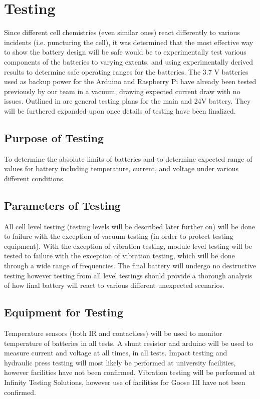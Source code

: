 \documentclass[main.tex]{subfiles}
\begin{document}
    
    
    \section{Testing}
    Since different cell chemistries (even similar ones) react differently to various incidents (i.e. puncturing the cell), it was determined that the most effective way to show the battery design will be safe would be to experimentally test various components of the batteries to varying  extents, and using experimentally derived results to determine safe operating ranges for the batteries. The 3.7 V batteries used as backup power for the Arduino and Raspberry Pi have already been tested previously by our team in a vacuum, drawing expected current draw with no issues. Outlined in  are general testing plans for the main and 24V battery. They will be furthered expanded upon once details of testing have been finalized.
    \subsection{Purpose of Testing}
    To determine the absolute limits of batteries and to determine expected range of values for battery including temperature, current, and voltage under various different conditions.
    \subsection{Parameters of Testing}
    All cell level testing (testing levels will be described later further on) will be done to failure with the exception of vacuum testing (in order to protect testing equipment). With the exception of vibration testing, module level testing will be tested to failure with the exception of vibration testing, which will be done through a wide range of frequencies. The final battery will undergo no destructive testing however testing from all level testings should provide a thorough analysis of how final battery will react to various different unexpected scenarios.
    \subsection{Equipment for Testing}
    Temperature sensors (both IR and contactless) will be used to monitor temperature of batteries in all tests. A shunt resistor and arduino will be used to measure current and voltage at all times, in all tests. Impact testing and hydraulic press testing will most likely be performed at university facilities, however facilities have not been confirmed. Vibration testing will be performed at Infinity Testing Solutions, however use of facilities for Goose III have not been confirmed.
\end{document}
